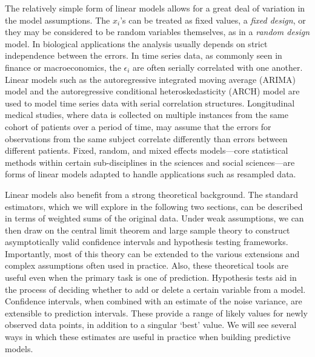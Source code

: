 \documentclass[12pt,hidelinks]{article}
\numberwithin{equation}{section}
\begin{document}
{The relatively simple form of linear models allows for a
great deal of variation in the model assumptions. The $x_i$'s can
be treated as fixed values, a \textit{fixed design}, or they may
be considered to be random variables themselves, as in a
\textit{random design} model. In biological
applications the analysis usually depends on strict independence
between the errors. In time series data, as commonly seen in finance or macroeconomics,
the $\epsilon_i$ are often serially correlated with one another.
Linear models such as the autoregressive integrated
moving average (ARIMA) model and the autoregressive conditional heteroskedasticity
(ARCH) model are used to model time series data with serial correlation
structures. Longitudinal medical studies, where data is collected on
multiple instances from the same cohort of patients over a period of
time, may assume that the errors for observations from the
same subject correlate differently than errors between different
patients. Fixed, random, and mixed effects
models---core statistical methods within certain sub-disciplines in
the sciences and social sciences---are forms of linear models adapted
to handle applications such as resampled data.

Linear models also benefit from a strong theoretical background. The
standard estimators, which we will explore in the following two sections,
can be described in terms of weighted sums of the original data. Under
weak assumptions, we can then draw on the central limit theorem and
large sample theory to construct asymptotically valid confidence
intervals and hypothesis testing frameworks. Importantly, most of this
theory can be extended to the various extensions and complex assumptions
often used in practice. Also, these theoretical tools are useful even
when the primary task is one of prediction. Hypothesis tests aid in
the process of deciding whether to add
or delete a certain variable from a model. Confidence intervals, when
combined with an estimate of the noise variance, are extensible to
prediction intervals. These provide a range of likely values for newly
observed data points, in addition to a singular `best' value. We
will see several ways in which these estimates are useful in practice
when building predictive models.

}
\end{document}
